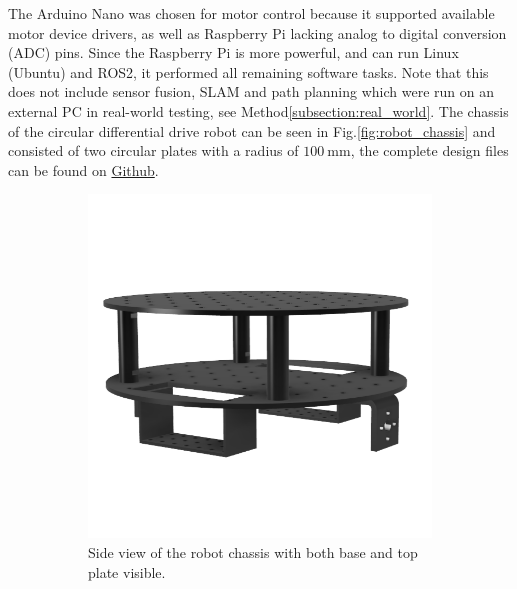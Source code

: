 The Arduino Nano was chosen for motor control because it supported available motor device drivers, as well as Raspberry Pi lacking analog to digital conversion (ADC) pins. Since the Raspberry Pi is more powerful, and can run Linux (Ubuntu) and ROS2, it performed all remaining software tasks. Note that this does not include sensor fusion, SLAM and path planning which were run on an external PC in real-world testing, see Method\:\ref{subsection:real_world}.
The chassis of the circular differential drive robot can be seen in Fig.\:\ref{fig:robot_chassis} and consisted of two circular plates with a radius of $100\:\text{mm}$, the complete design files can be found on \href{https://github.com/MobiBotInnovate}{Github}. 
\begin{figure}
    \centering
	\begin{subfigure}[t]{0.49\columnwidth}
		\centering
		\includegraphics[width=\textwidth]{images/model_top.png}
		\caption{Side view of the robot chassis with both base and top plate visible.}
        \label{fig:top_chassis}
	\end{subfigure}
    \hfill
	\begin{subfigure}[t]{0.49\columnwidth}
		\centering

\end{subfigure}
\end{figure}
